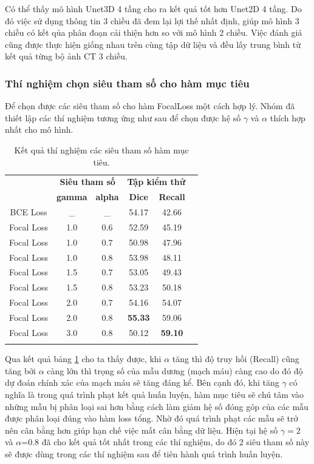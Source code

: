 Có thể thấy mô hình Unet3D 4 tầng cho ra kết quả tốt hơn Unet2D 4 tầng. Do đó việc sử dụng thông tin 3 chiều đã đem lại lợi thế nhất định, giúp mô hình 3 chiều có kết qủa phân đoạn cải thiện hơn so với mô hình 2 chiều. Việc đánh giá cũng được thực hiện giống nhau trên cùng tập dữ liệu và đều lấy trung bình từ kết quả từng bộ ảnh CT 3 chiều.

\subsubsection{Thí nghiệm chọn siêu tham số cho hàm mục tiêu}
Để chọn được các siêu tham số cho hàm FocalLoss một cách hợp lý. Nhóm đã thiết lập các thí nghiệm tương ứng như sau để chọn được hệ số $\gamma$ và $\alpha$ thích hợp nhất cho mô hình.

\begin{table}[H]
    \centering
    \begin{tabular}{c c c c c c}
    \Xhline{3\arrayrulewidth}
    \multirow{2}{*}{\textbf{Hàm lỗi}} & \multicolumn{2}{c}{\textbf{Siêu tham số}} & \multicolumn{2}{c}{\textbf{Tập kiểm thử}} \\ \cline{2-5}
     & \textbf{gamma} & \textbf{alpha} & \textbf{Dice} & \textbf{Recall} \\
    \hline
    BCE Loss   & \_  & \_  & 54.17 & 42.66 \\
    \hline
    Focal Loss & 1.0 & 0.6 & 52.59 & 45.19\\
    Focal Loss & 1.0 & 0.7 & 50.98 & 47.96\\
    Focal Loss & 1.0 & 0.8 & 53.98 & 48.11\\
    Focal Loss & 1.5 & 0.7 & 53.05 & 49.43\\
    Focal Loss & 1.5 & 0.8 & 53.23 & 50.18\\
    Focal Loss & 2.0 & 0.7 & 54.16 & 54.07\\
    Focal Loss & 2.0 & 0.8 & \textbf{55.33}  & 59.06\\
    Focal Loss & 3.0 & 0.8 & 50.12 & \textbf{59.10}\\
    \Xhline{3\arrayrulewidth}
    \end{tabular}
    \caption{Kết quả thí nghiệm các siêu tham số hàm mục tiêu.}
    \label{table:focal}
\end{table}
\vspace{-0.65cm}
Qua kết quả bảng \ref{table:focal} cho ta thấy được, khi $\alpha$ tăng thì độ truy hồi (Recall) cũng tăng bởi $\alpha$ càng lớn thì trọng số của mẫu dương (mạch máu) càng cao do đó độ dự đoán chính xác của mạch máu sẽ tăng đáng kể. Bên cạnh đó, khi tăng $\gamma$ có nghĩa là trong quá trình phạt kết quả huấn luyện, hàm mục tiêu sẽ chú tâm vào những mẫu bị phân loại sai hơn bằng cách làm giảm hệ số đóng góp của các mẫu được phân loại đúng vào hàm loss tổng. Nhờ đó quá trình phạt các mẫu sẽ trở nên cân bằng hơn giúp hạn chế việc mất cân bằng dữ liệu. Hiện tại hệ số $\gamma=2$ và $\alpha$=0.8 đã cho kết quả tốt nhất trong các thí nghiệm, do đó 2 siêu tham số này sẽ được dùng trong các thí nghiệm sau để tiên hành quá trình huấn luyện.
